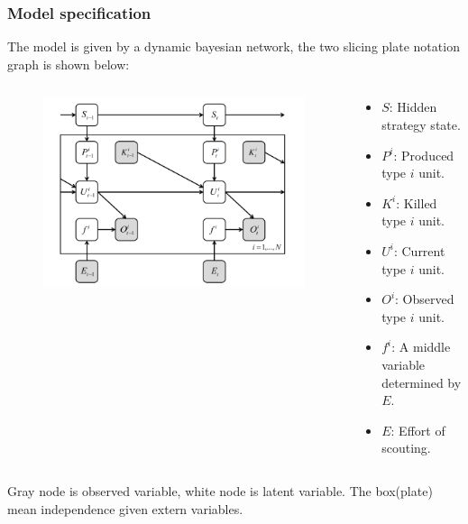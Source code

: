 \documentclass{beamer}
\begin{document}
\begin{frame}
    \frametitle{Model specification}

    The model is given by a dynamic bayesian network, the two slicing plate notation graph is shown below:

    \begin{columns}[T]

    \begin{column}{.4\textwidth}
    \begin{figure}[htb]
        \centering
        \includegraphics[width=0.9\linewidth]{starcraft_pg.png}
    \end{figure}    

    \end{column}
    \begin{column}{.6\textwidth}
        \begin{itemize}
            \item $S$: Hidden strategy state.
            \item $P^i$: Produced type $i$ unit.
            \item $K^i$: Killed type $i$ unit.
            \item $U^i$: Current type $i$ unit.
            \item $O^i$: Observed type $i$ unit.
            \item $f^i$: A middle variable determined by $E$.
            \item $E$: Effort of scouting.
        \end{itemize}
    \end{column}

    \end{columns}

    Gray node is observed variable, white node is latent variable. 
    The box(plate) mean independence given extern variables.

\end{frame}
\end{document}
